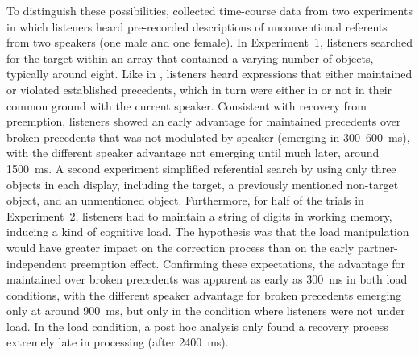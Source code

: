 \documentclass[doc,fignum,apacite,floatsintext]{apa6}
\begin{document}
To distinguish these possibilities,  collected time-course data from two experiments in which listeners heard pre-recorded descriptions of unconventional referents from two speakers (one male and one female).  In Experiment~1, listeners searched for the target within an array that contained a varying number of objects, typically around eight.  Like in , listeners heard expressions that either maintained or violated established precedents, which in turn were either in or not in their common ground with the current speaker.  Consistent with recovery from preemption, listeners showed an early advantage for maintained precedents over broken precedents that was not modulated by speaker (emerging in 300--600~ms), with the different speaker advantage not emerging until much later, around 1500~ms.  A second experiment simplified referential search by using only three objects in each display, including the target, a previously mentioned non-target object, and an unmentioned object.  Furthermore, for half of the trials in Experiment~2, listeners had to maintain a string of digits in working memory, inducing a kind of cognitive load.  The hypothesis was that the load manipulation would have greater impact on the correction process than on the early partner-independent preemption effect.  Confirming these expectations, the advantage for maintained over broken precedents was apparent as early as 300~ms in both load conditions, with the different speaker advantage for broken precedents emerging only at around 900~ms, but only in the condition where listeners were not under load.  In the load condition, a post hoc analysis only found a recovery process extremely late in processing (after 2400~ms).
\end{document}
